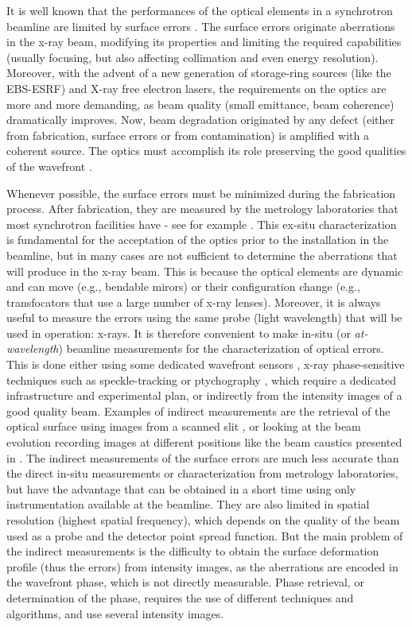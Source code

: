\documentclass[preprint]{iucr}
\newcommand{\inred}[1]{{\color{red}#1}}
\begin{document}
It is well known that the performances of the optical elements in  a synchrotron beamline are limited by surface errors \inred{\cite{Yabashi2014, Schroer2014, Cocco2022}}. The surface errors originate aberrations in the x-ray beam, modifying its properties and limiting the required capabilities (usually focusing, but also affecting collimation and even energy resolution). Moreover, with the advent of a new generation of storage-ring sources (like the EBS-ESRF) and X-ray free electron lasers, the requirements on the optics are more and more demanding, as beam quality (small emittance, beam coherence) dramatically improves. Now, beam degradation originated by any defect (either from fabrication, surface errors or from contamination) is amplified with a coherent source. The optics must accomplish its role preserving the good qualities of the wavefront \cite{Cocco2022}. 

Whenever possible, the surface errors must be minimized during the fabrication process. After fabrication, they are measured by the metrology laboratories that most synchrotron facilities have - \inred{see for example \cite{round_robin1, round_robin2, round_robin3}}. This ex-situ characterization is fundamental for the acceptation of the optics prior to the installation in the beamline, but in many cases are not sufficient to determine the aberrations that will produce in the x-ray beam. This is because the optical elements are dynamic and can move (e.g., bendable mirors) or their configuration change (e.g., transfocators that use a large number of x-ray lenses). Moreover, it is always useful to measure the errors using the same probe (light wavelength) that will be used in operation: x-rays. It is therefore convenient to make in-situ (or \textit{at-wavelength}) beamline measurements for the characterization of optical errors. This is done either using some dedicated wavefront sensors \inred{\cite{Mercere2005, Mikhaylov2020}, x-ray phase-sensitive techniques such as speckle-tracking \cite{berujon_theory_2020, berujon_experiments_2020} or ptychography \cite{Schropp2013}}, which require a dedicated infrastructure and experimental plan, or indirectly from the intensity images of a good quality beam. Examples of indirect measurements are the retrieval of the optical surface using images from a scanned slit \cite{Zhang:ve5019}, or looking at the beam evolution recording images at different positions \inred{like the beam caustics presented in \cite{Celestre:yi5119}}. The indirect measurements of the surface errors are much less accurate than the direct in-situ measurements or characterization from metrology laboratories, but have the advantage that can be obtained in a short time using only instrumentation available at the beamline. They are also limited in spatial resolution (highest spatial frequency), which depends on the quality of the beam used as a probe and the detector point spread function. But the main problem of the indirect measurements is the difficulty to obtain the surface deformation profile (thus the errors) from intensity images, as the aberrations are encoded in the wavefront phase, which is not directly measurable. Phase retrieval, or determination of the phase, requires the use of different techniques and algorithms, and use several intensity images.
\end{document}
